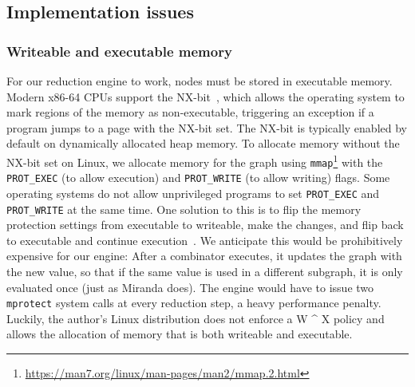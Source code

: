 \documentclass[conference]{IEEEtran}
\begin{document}
\subsection{Implementation issues}
\subsubsection{Writeable and executable memory}
For our reduction engine to work, nodes must be stored in executable memory.
Modern x86-64 CPUs support the NX-bit~\cite{paulson_new_2004}, which allows the operating system to mark regions of the memory as non-executable, triggering an exception if a program jumps to a page with the NX-bit set.
The NX-bit is typically enabled by default on dynamically allocated heap memory.
To allocate memory without the NX-bit set on Linux, we allocate memory for the graph using \texttt{mmap}\footnote{\url{https://man7.org/linux/man-pages/man2/mmap.2.html}} with the \texttt{PROT\_EXEC} (to allow execution) and \texttt{PROT\_WRITE} (to allow writing) flags.
Some operating systems do not allow unprivileged programs to set \texttt{PROT\_EXEC} and \texttt{PROT\_WRITE} at the same time.
One solution to this is to flip the memory protection settings from executable to writeable, make the changes, and flip back to executable and continue execution~\cite{de_mooij_wx_2015}.
We anticipate this would be prohibitively expensive for our engine: After a combinator executes, it updates the graph with the new value, so that if the same value is used in a different subgraph, it is only evaluated once (just as Miranda does).
The engine would have to issue two \texttt{mprotect} system calls at every reduction step, a heavy performance penalty.
Luckily, the author's Linux distribution does not enforce a W \^{} X policy and allows the allocation of memory that is both writeable and executable.
\end{document}
